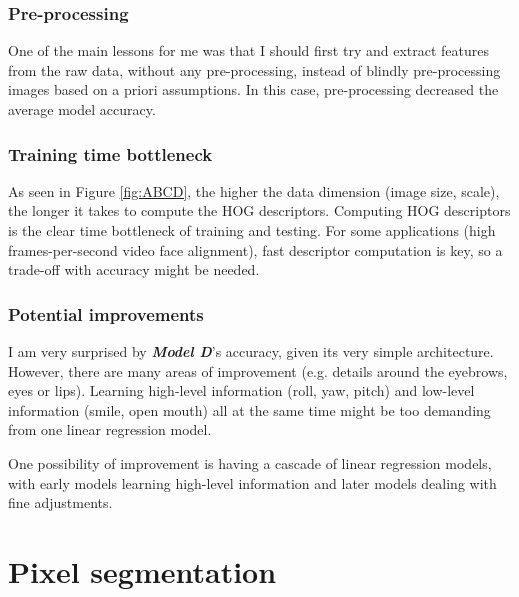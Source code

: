 \documentclass{article}
\begin{document}
\subsubsection{Pre-processing}
One of the main lessons for me was that I should first try and extract features from the raw data, without any pre-processing, instead of blindly pre-processing images based on a priori assumptions. In this case, pre-processing decreased the average model accuracy.

\subsubsection{Training time bottleneck}
As seen in Figure \ref{fig:ABCD}, the higher the data dimension (image size, scale), the longer it takes to compute the HOG descriptors. Computing HOG descriptors is the clear time bottleneck of training and testing. For some applications (high frames-per-second video face alignment), fast descriptor computation is key, so a trade-off with accuracy might be needed.

\subsubsection{Potential improvements}
I am very surprised by \textbf{\textit{Model D}}'s accuracy, given its very simple architecture. However, there are many areas of improvement (e.g. details around the eyebrows, eyes or lips). Learning high-level information (roll, yaw, pitch) and low-level information (smile, open mouth) all at the same time might be too demanding from one linear regression model.

One possibility of improvement is having a cascade of linear regression models, with early models learning high-level information and later models dealing with fine adjustments.

\section{Pixel segmentation}
\end{document}
